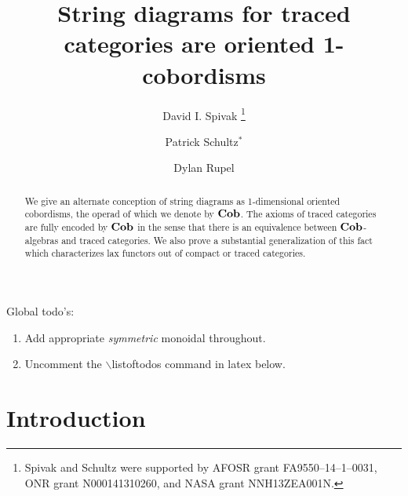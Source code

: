 \documentclass[12pt,oneside,article,draft]{memoir}
\title{String diagrams for traced categories are oriented 1-cobordisms}
\author{
   David I. Spivak
      \thanks{Spivak and Schultz were supported by AFOSR grant FA9550--14--1--0031, ONR grant N000141310260, and NASA grant NNH13ZEA001N.}
   \and Patrick Schultz${}^*$%
   \and Dylan Rupel
}
\begin{document}
\tightlists
\firmlists

\maketitle
\begin{abstract}
   We give an alternate conception of string diagrams as 1-dimensional oriented cobordisms, the
   operad of which we denote by $\mathbf{Cob}$.  The axioms of traced categories are fully encoded by $\mathbf{Cob}$
   in the sense that there is an equivalence between $\mathbf{Cob}$-algebras and
   traced categories.  We also prove a substantial generalization of this fact which characterizes
   lax functors out of compact or traced categories.
\end{abstract}
Global todo's:
\begin{enumerate}
   \item Add appropriate {\em symmetric\/} monoidal throughout.
   \item Uncomment the $\backslash${listoftodos} command in latex below.
\end{enumerate}

\setcounter{tocdepth}{1}
\tableofcontents*

\chapter{Introduction}
\end{document}
